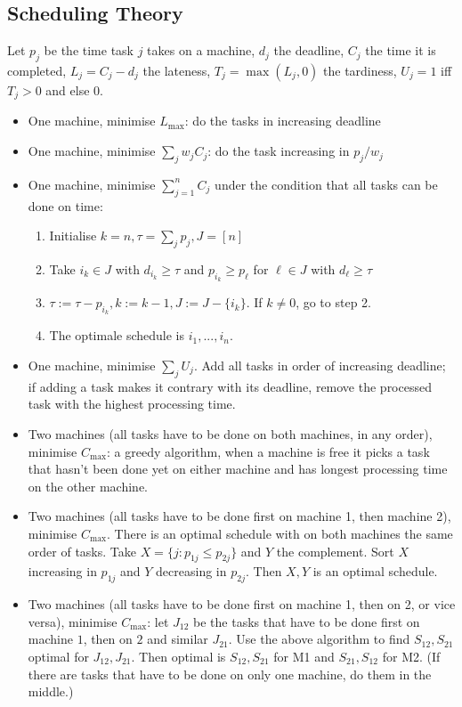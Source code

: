 \documentclass[9pt,a4paper,landscape,oneside]{amsart}
\newenvironment{myitemize}
{\begin{itemize}[leftmargin=.3cm]
	\setlength{\itemsep}{0pt}
	\setlength{\parskip}{0pt}
	\setlength{\parsep}{0pt}     }
{ \end{itemize}                  }
\begin{document}
\begin{multicols*}{3}
\section{Scheduling Theory}
Let $p_j$ be the time task $j$ takes on a machine, $d_j$ the deadline, $C_j$ the time it is completed, $L_j = C_j - d_j$ the lateness, $T_j = \max(L_j,0)$ the tardiness, $U_j = 1$ iff $T_j > 0$ and else $0$.
\begin{myitemize}
	\item One machine, minimise $L_{\max}$: do the tasks in increasing deadline
	\item One machine, minimise $\sum_j w_j C_j$: do the task increasing in $p_j/w_j$
	\item One machine, minimise $\sum_{j=1}^n C_j$ under the condition that all tasks can be done on time:
		\begin{enumerate}
			\item Initialise $k = n, \tau = \sum_j p_j, J = [n]$
			\item Take $i_k \in J$ with $d_{i_k} \geq \tau$ and $p_{i_k} \geq p_\ell$ for $\ell\in J$ with $d_\ell \geq \tau$
			\item $\tau := \tau - p_{i_k}, k := k-1, J := J- \{i_k\}$. If $k\not = 0$, go to step 2.
			\item The optimale schedule is $i_1,...,i_n$.
		\end{enumerate} 
	\item One machine, minimise $\sum_j U_j$. Add all tasks in order of increasing deadline; if adding a task makes it contrary with its deadline, remove the processed task with the highest processing time.
	\item Two machines (all tasks have to be done on both machines, in any order), minimise $C_{\max}$: a greedy algorithm, when a machine is free it picks a task that hasn't been done yet on either machine and has longest processing time on the other machine.
	\item Two machines (all tasks have to be done first on machine 1, then machine 2), minimise $C_{\max}$. There is an optimal schedule with on both machines the same order of tasks. Take $X = \{j : p_{1j} \leq p_{2j}\}$ and $Y$ the complement. Sort $X$ increasing in $p_{1j}$ and $Y$ decreasing in $p_{2j}$. Then $X,Y$ is an optimal schedule.
	\item Two machines (all tasks have to be done first on machine 1, then on 2, or vice versa), minimise $C_{\max}$: let $J_{12}$ be the tasks that have to be done first on machine $1$, then on $2$ and similar $J_{21}$. Use the above algorithm to find $S_{12},S_{21}$ optimal for $J_{12},J_{21}$. Then optimal is $S_{12},S_{21}$ for M1 and $S_{21},S_{12}$ for M2. (If there are tasks that have to be done on only one machine, do them in the middle.)
\end{myitemize}


\end{multicols*}
\end{document}
